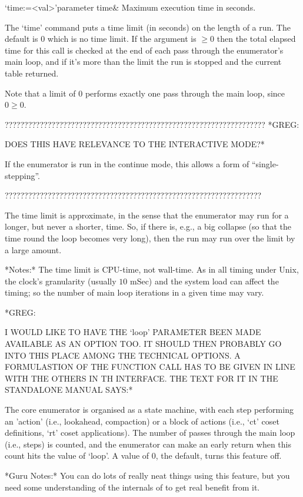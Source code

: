 \>`time:=<val>'{parameter time}&
Maximum execution time in seconds.

The `time' command  puts a time limit (in seconds) on  the length of a
run.  The  default is 0  which is no  time limit.  If the  argument is
$\ge0$ then the total elapsed time for this call is checked at the end
of each pass through the enumerator's main loop, and if it's more than
the limit the run is stopped and the current table returned.

Note that a limit of $0$ performs exactly one pass through the main
loop, since $0 \ge 0$.

\begintt
???????????????????????????????????????????????????????????????????
*GREG:

DOES THIS HAVE RELEVANCE TO THE INTERACTIVE MODE?*

If the enumerator is run in the continue mode, this allows a form of
  ``single-stepping''\kern-1.5pt.

??????????????????????????????????????????????????????????????????
\endtt

The time  limit is approximate, in  the sense that  the enumerator may
run for a longer, but never a shorter, time.  So, if there is, e.g., a
big collapse (so that the time round the loop becomes very long), then
the run may run over the limit by a large amount.

*Notes:*
The time  limit is  CPU-time, not wall-time.   As in all  timing under
Unix, the clock's granularity (usually  $10$ mSec) and the system load
can affect  the timing;  so the  number of main  loop iterations  in a
given time may vary.

\begintt
*GREG:

I WOULD  LIKE TO HAVE THE  `loop' PARAMETER BEEN MADE  AVAILABLE AS AN
OPTION  TOO. IT  SHOULD THEN  PROBABLY GO  INTO THIS  PLACE  AMONG THE
TECHNICAL OPTIONS. A FORMULASTION OF THE FUNCTION CALL HAS TO BE GIVEN
IN  LINE WITH  THE OTHERS  IN TH  INTERFACE. THE  TEXT FOR  IT  IN THE
STANDALONE MANUAL SAYS:*
\endtt


The core enumerator is organised as a state machine, with each step
performing an 'action' (i.e., lookahead, compaction) or a block of
actions (i.e., `ct' coset definitions, `rt' coset applications).
The number of passes through the main loop (i.e., steps) is counted, and
the enumerator can make an early return when this count hits the
value of `loop'.
A value of $0$, the default, turns this feature off.

*Guru Notes:*
You can do lots of really neat things using this feature, but you need
some understanding of the internals of {\ACE} to get real benefit from
it.


